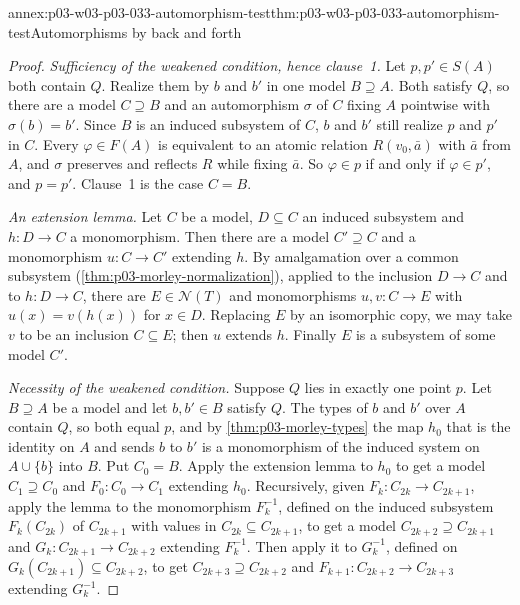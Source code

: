 \begin{annexitem}{annex:p03-w03-p03-033-automorphism-test}{thm:p03-w03-p03-033-automorphism-test}{Automorphisms by back and forth}
\begin{proof}
\emph{Sufficiency of the weakened condition, hence clause~1.} Let
\(p,p'\in S(A)\) both contain \(Q\). Realize them by \(b\) and \(b'\) in
one model \(B\supseteq A\). Both satisfy \(Q\), so there are a model
\(C\supseteq B\) and an automorphism \(\sigma\) of \(C\) fixing \(A\)
pointwise with \(\sigma(b)=b'\). Since \(B\) is an induced subsystem of
\(C\), \(b\) and \(b'\) still realize \(p\) and \(p'\) in \(C\). Every
\(\varphi\in F(A)\) is equivalent to an atomic relation \(R(v_0,\bar a)\)
with \(\bar a\) from \(A\), and \(\sigma\) preserves and reflects
\(R\) while fixing \(\bar a\). So \(\varphi\in p\) if and only if
\(\varphi\in p'\), and \(p=p'\). Clause~1 is the case \(C=B\).

\emph{An extension lemma.} Let \(C\) be a model, \(D\subseteq C\) an
induced subsystem and \(h:D\to C\) a monomorphism. Then there are a model
\(C'\supseteq C\) and a monomorphism \(u:C\to C'\) extending \(h\).
By amalgamation over a common subsystem
(\cref{thm:p03-morley-normalization}), applied to the inclusion
\(D\to C\) and to \(h:D\to C\), there are \(E\in\mathcal N(T)\) and
monomorphisms \(u,v:C\to E\) with \(u(x)=v(h(x))\) for \(x\in D\).
Replacing \(E\) by an isomorphic copy, we may take \(v\) to be an
inclusion \(C\subseteq E\); then \(u\) extends \(h\). Finally \(E\) is a
subsystem of some model \(C'\).

\emph{Necessity of the weakened condition.} Suppose \(Q\) lies in exactly
one point \(p\). Let \(B\supseteq A\) be a model and let \(b,b'\in B\)
satisfy \(Q\). The types of \(b\) and \(b'\) over \(A\) contain \(Q\), so
both equal \(p\), and by \cref{thm:p03-morley-types} the map \(h_0\) that
is the identity on \(A\) and sends \(b\) to \(b'\) is a monomorphism of
the induced system on \(A\cup\{b\}\) into \(B\). Put \(C_0=B\).
Apply the extension lemma to \(h_0\) to get a model \(C_1\supseteq C_0\)
and \(F_0:C_0\to C_1\) extending \(h_0\). Recursively, given
\(F_k:C_{2k}\to C_{2k+1}\), apply the lemma to the monomorphism
\(F_k^{-1}\), defined on the induced subsystem \(F_k(C_{2k})\) of
\(C_{2k+1}\) with values in \(C_{2k}\subseteq C_{2k+1}\), to get a model
\(C_{2k+2}\supseteq C_{2k+1}\) and \(G_k:C_{2k+1}\to C_{2k+2}\) extending
\(F_k^{-1}\). Then apply it to \(G_k^{-1}\), defined on
\(G_k(C_{2k+1})\subseteq C_{2k+2}\), to get
\(C_{2k+3}\supseteq C_{2k+2}\) and \(F_{k+1}:C_{2k+2}\to C_{2k+3}\)
extending \(G_k^{-1}\).


\end{proof}
\end{annexitem}
